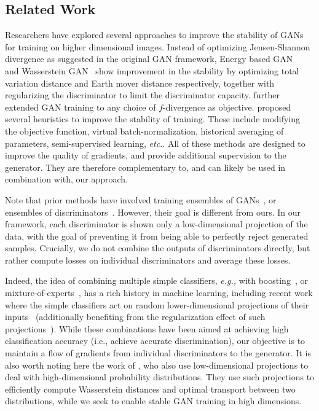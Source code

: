 \documentclass{article}
\begin{document}
\subsection{Related Work}\label{sec:related}

Researchers have explored several approaches to improve the stability of GANs for training on higher dimensional images. Instead of optimizing Jensen-Shannon divergence as suggested in the original GAN framework, Energy based GAN ~\citep{zhao2016energy} and Wasserstein GAN~\citep{arjovsky2017wasserstein} show improvement in the stability by optimizing total variation distance and Earth mover distance respectively, together with regularizing the discriminator to limit the discriminator capacity. \citet{nowozin2016f} further extended GAN training to any choice of $f$-divergence as objective. \citet{salimans2016improved} proposed several heuristics to improve the stability of training. These include modifying the objective function, virtual batch-normalization, historical averaging of parameters, semi-supervised learning, \emph{etc.}. All of these methods are designed to improve the quality of gradients, and provide additional supervision to the generator.  They are therefore complementary to, and can likely be used in combination with, our approach.

Note that prior methods have involved  training ensembles of GANs~\citep{wang2016ensembles}, or ensembles of discriminators~\citep{durugkar2016generative}. However, their goal is different from ours. In our framework, each discriminator is shown only a low-dimensional projection of the data, with the goal of preventing it from being able to perfectly reject generated samples. Crucially, we do not combine the outputs of discriminators directly, but rather compute losses on individual discriminators and average these losses.

Indeed, the idea of combining multiple simple classifiers, \emph{e.g.,} with boosting~\citep{freund1996experiments}, or mixture-of-experts~\cite{moe}, has a rich history in machine learning, including recent work where the simple classifiers act on random lower-dimensional projections of their inputs~\citep{cannings2017random} (additionally benefiting from the regularization effect of such projections~\citep{durrant2015random}). While these combinations have been aimed at achieving high classification accuracy (i.e., achieve accurate discrimination), our objective is to maintain a flow of gradients from individual discriminators to the generator. It is also worth noting here the work of \citet{bonneel2015sliced}, who also use low-dimensional projections to deal with high-dimensional probability distributions. They use such projections to efficiently compute Wasserstein distances and optimal transport between two distributions, while we seek to enable stable GAN training in high dimensions.
\end{document}
